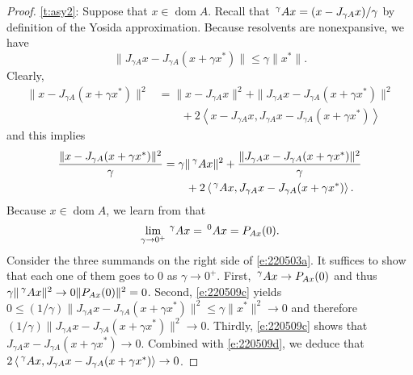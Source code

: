 \documentclass[12pt]{article}
\newcommand{\moyo}[2]{\ensuremath{\sideset{^{#2}}{}{\operatorname{}}\!#1}}
\newcommand{\scal}[2]{\left\langle{#1},{#2}  \right\rangle}
\newcommand{\dom}{\ensuremath{\operatorname{dom}}}
\theoremstyle{definition}
\providecommand{\dom}{\operatorname{dom}}
\begin{document}
{\begin{proof}
\cref{t:asy2}: Suppose that $x\in\dom A$. 
Recall that $\moyo{A}{\gamma}x = (x-J_{\gamma A}x)/\gamma$ by definition of the Yosida approximation. 
Because resolvents are nonexpansive, we have 
\begin{equation}
\label{e:220509c}
\|J_{\gamma A}x-J_{\gamma A}(x+\gamma x^*)\|\leq \gamma\|x^*\|. 
\end{equation}
Clearly, 
\begin{subequations}
\begin{align}
\|x-J_{\gamma A}(x+\gamma x^*)\|^2
&=
\|x-J_{\gamma A}x\|^2 + \|J_{\gamma A}x-J_{\gamma A}(x+\gamma x^*)\|^2\\
&\qquad +2\scal{x-J_{\gamma A}x}{J_{\gamma A}x-J_{\gamma A}(x+\gamma x^*)} 
\end{align}
\end{subequations}
and this implies 
\begin{subequations}
\label{e:220503a}
\begin{align}
\frac{\|x-J_{\gamma A}(x+\gamma x^*)\|^2}{\gamma}
&= \gamma\|\moyo{A}{\gamma}x\|^2
+\frac{\|J_{\gamma A}x-J_{\gamma A}(x+\gamma x^*)\|^2}{\gamma}\\
&\qquad + 2\scal{\moyo{A}{\gamma}x}{J_{\gamma A}x-J_{\gamma A}(x+\gamma x^*)}. 
\end{align}
\end{subequations}
Because $x\in\dom A$, we learn from \cite[Corollary~23.46(i)]{BC2017} that
\begin{equation}
\label{e:220509d}
\lim_{\gamma\to 0^+} \moyo{A}{\gamma}x = \moyo{A}{0}x= P_{Ax}(0). 
\end{equation}
Consider the three summands on the right side of \cref{e:220503a}. 
It suffices to show that each one of them goes to $0$ as $\gamma\to 0^+$. 
First, 
$\moyo{A}{\gamma}x\to P_{Ax}(0)$ and thus 
$\gamma\|\moyo{A}{\gamma}x\|^2\to 0\|P_{Ax}(0)\|^2 = 0$.
Second, \cref{e:220509c} yields 
$0\leq (1/\gamma)\|J_{\gamma A}x-J_{\gamma A}(x+\gamma x^*)\|^2
\leq \gamma\|x^*\|^2 \to 0$ and therefore
$(1/\gamma)\|J_{\gamma A}x-J_{\gamma A}(x+\gamma x^*)\|^2\to 0$. 
Thirdly, \cref{e:220509c} shows that 
$J_{\gamma A}x-J_{\gamma A}(x+\gamma x^*)\to 0$. 
Combined with \cref{e:220509d}, we deduce that 
$2\scal{\moyo{A}{\gamma}x}{J_{\gamma A}x-J_{\gamma A}(x+\gamma x^*)}\to 0$. 
\end{proof}

}
\end{document}
